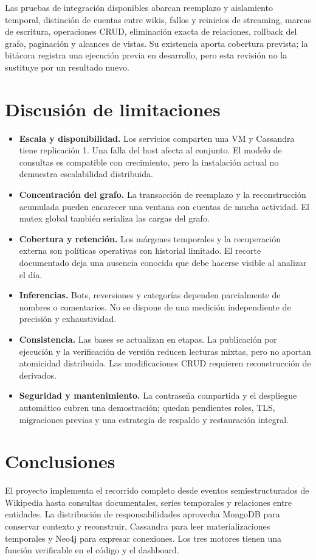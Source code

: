 Las pruebas de integración disponibles abarcan reemplazo y aislamiento temporal, distinción de cuentas entre wikis, fallos y reinicios de streaming, marcas de escritura, operaciones CRUD, eliminación exacta de relaciones, rollback del grafo, paginación y alcances de vistas. Su existencia aporta cobertura prevista; la bitácora registra una ejecución previa en desarrollo, pero esta revisión no la sustituye por un resultado nuevo.

\section{Discusión de limitaciones}
\begin{itemize}
\item \textbf{Escala y disponibilidad.} Los servicios comparten una VM y Cassandra tiene replicación 1. Una falla del host afecta al conjunto. El modelo de consultas es compatible con crecimiento, pero la instalación actual no demuestra escalabilidad distribuida.
\item \textbf{Concentración del grafo.} La transacción de reemplazo y la reconstrucción acumulada pueden encarecer una ventana con cuentas de mucha actividad. El mutex global también serializa las cargas del grafo.
\item \textbf{Cobertura y retención.} Los márgenes temporales y la recuperación externa son políticas operativas con historial limitado. El recorte documentado deja una ausencia conocida que debe hacerse visible al analizar el día.
\item \textbf{Inferencias.} Bots, reversiones y categorías dependen parcialmente de nombres o comentarios. No se dispone de una medición independiente de precisión y exhaustividad.
\item \textbf{Consistencia.} Las bases se actualizan en etapas. La publicación por ejecución y la verificación de versión reducen lecturas mixtas, pero no aportan atomicidad distribuida. Las modificaciones CRUD requieren reconstrucción de derivados.
\item \textbf{Seguridad y mantenimiento.} La contraseña compartida y el despliegue automático cubren una demostración; quedan pendientes roles, TLS, migraciones previas y una estrategia de respaldo y restauración integral.
\end{itemize}

\section{Conclusiones}
El proyecto implementa el recorrido completo desde eventos semiestructurados de Wikipedia hasta consultas documentales, series temporales y relaciones entre entidades. La distribución de responsabilidades aprovecha MongoDB para conservar contexto y reconstruir, Cassandra para leer materializaciones temporales y Neo4j para expresar conexiones. Los tres motores tienen una función verificable en el código y el dashboard.

